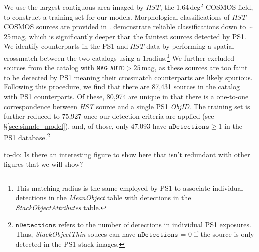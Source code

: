 \documentclass[twocolumn]{aastex62}
\newcommand{\todo}[1]{{\color{magenta} to-do: {#1}}}
\begin{document}
We use the largest contiguous area imaged by \textit{HST}, the 1.64\,deg$^2$
COSMOS field, to construct a training set for our models. Morphological
classifications of \textit{HST} COSMOS sources are provided in
\citet{Leauthaud07}. \citeauthor{Leauthaud07} demonstrate reliable
classifications down to $\sim$25\,mag, which is significantly deeper than the
faintest sources detected by PS1. We identify counterparts in the PS1 and
\textit{HST} data by performing a spatial crossmatch between the two catalogs
using a 1\arcsec radius.\footnote{This matching radius is the same employed by
PS1 to associate individual detections in the \textit{MeanObject} table with
detections in the \textit{StackObjectAttributes} table.} We further excluded
sources from the \citet{Leauthaud07} catalog with $\texttt{MAG\_AUTO} >
25$\,mag, as these sources are too faint to be detected by PS1 meaning their
crossmatch counterparts are likely spurious. Following this procedure, we find
that there are 87,431 sources in the \citet{Leauthaud07} catalog with PS1
counterparts. Of these, 80,974 are unique in that there is a one-to-one
correspondence between \textit{HST} source and a single PS1 \textit{ObjID}. The
training set is further reduced to 75,927 once our detection criteria are
applied (see \S\ref{sec:simple_model}), and, of those, only 47,093 have
$\texttt{nDetections} \ge 1$ in the PS1
database.\footnote{$\texttt{nDetections}$ refers to the number of detections in
individual PS1 exposures. Thus, \textit{StackObjectThin} souces can have
$\texttt{nDetections}$ = 0 if the source is only detected in the PS1 stack
images.}

\todo{Is there an interesting figure to show here that isn't redundant with other figures that we will show?}
\end{document}
